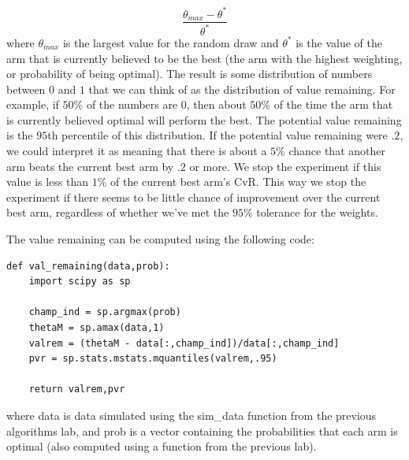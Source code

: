 \begin{equation}\label{valrem}
\frac{\theta_{max} - \theta^*}{\theta^*}
\end{equation}
where $\theta_{max}$ is the largest value for the random draw and $\theta^*$ is the value of the arm that is currently believed to be the best (the arm with the highest weighting, or probability of being optimal).  The result is some distribution of numbers between $0$ and $1$ that we can think of as the distribution of value remaining.  For example, if $50\%$ of the numbers are 0, then about $50\%$ of the time the arm that is currently believed optimal will perform the best.  The potential value remaining is the $95$th percentile of this distribution.  If the potential value remaining were $.2$, we could interpret it as meaning that there is about a $5\%$ chance that another arm beats the current best arm by $.2$ or more.  We stop the experiment if this value is less than $1\%$ of the current best arm's CvR.  This way we stop the experiment if there seems to be little chance of improvement over the current best arm, regardless of whether we've met the $95\%$ tolerance for the weights.

The value remaining can be computed using the following code:

\begin{lstlisting}[style = python]
def val_remaining(data,prob):
    import scipy as sp

    champ_ind = sp.argmax(prob)
    thetaM = sp.amax(data,1)
    valrem = (thetaM - data[:,champ_ind])/data[:,champ_ind]
    pvr = sp.stats.mstats.mquantiles(valrem,.95)

    return valrem,pvr
\end{lstlisting}
where data is data simulated using the sim\_data function from the previous algorithms lab, and prob is a vector containing the probabilities that each arm is optimal (also computed using a function from the previous lab).

